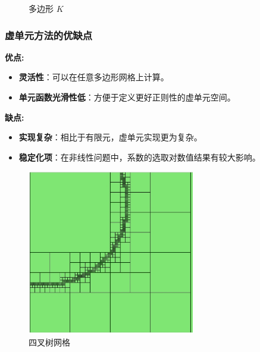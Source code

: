 \documentclass[notheorems,serif]{beamer}
\begin{document}
\begin{frame}
\begin{minipage}[b]{0.38\linewidth}
\begin{figure}[htpb]
        \caption{多边形 $K$}
    \end{figure}
\end{minipage}
\end{frame}

\begin{frame}
    \frametitle{虚单元方法的优缺点}
\begin{minipage}[b]{0.6\linewidth}
\textbf{优点:}
\begin{itemize}
    \item \textbf{灵活性}：可以在任意多边形网格上计算。
    \item \textbf{单元函数光滑性低}：方便于定义更好正则性的虚单元空间。
\end{itemize}
\vspace{10pt}
\textbf{缺点:}
\begin{itemize}
    \item \textbf{实现复杂}：相比于有限元，虚单元实现更为复杂。 
    \item \textbf{稳定化项}：在非线性问题中，系数的选取对数值结果有较大影响。
\end{itemize}
\end{minipage}
\hfill
\begin{minipage}[b]{0.38\linewidth}
    \centering
    \begin{figure}[htpb]
        \centering
        \includegraphics[width=0.65\textwidth]{../figures/four.jpg}
        \caption{四叉树网格}
    \end{figure}
\end{minipage}
\end{frame}
\end{document}

